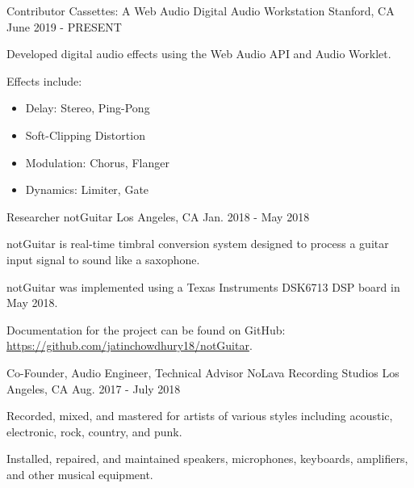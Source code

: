 \begin{cventries}
    \cventry
    {Contributor} %
    {Cassettes: A Web Audio Digital Audio Workstation} %
    {Stanford, CA} %
    {June 2019 - PRESENT} %
    {
      \begin{cvitems} %
        \item {Developed digital audio effects using the Web Audio API and Audio Worklet.}
        \item {Effects include:}
        \begin{itemize}
            \item {Delay: Stereo, Ping-Pong}
            \item {Soft-Clipping Distortion}
            \item {Modulation: Chorus, Flanger}
            \item {Dynamics: Limiter, Gate}
        \end{itemize}
      \end{cvitems}
    }

    \cventry
    {Researcher} %
    {notGuitar} %
    {Los Angeles, CA} %
    {Jan. 2018 - May 2018} %
    {
      \begin{cvitems} %
        \item {notGuitar is real-time timbral conversion system designed to process a guitar input signal to sound like a saxophone.}
        \item {notGuitar was implemented using a Texas Instruments DSK6713 DSP board in May 2018.}
        \item {Documentation for the project can be found on GitHub: \url{https://github.com/jatinchowdhury18/notGuitar}.}
      \end{cvitems}
    }

    \cventry
    {Co-Founder, Audio Engineer, Technical Advisor} %
    {NoLava Recording Studios} %
    {Los Angeles, CA} %
    {Aug. 2017 - July 2018} %
    {
      \begin{cvitems} %
        \item {Recorded, mixed, and mastered for artists of various styles including acoustic, electronic, rock, country, and punk.}
        \item {Installed, repaired, and maintained speakers, microphones, keyboards, amplifiers, and other musical equipment.}
      \end{cvitems}
    }

\end{cventries}
